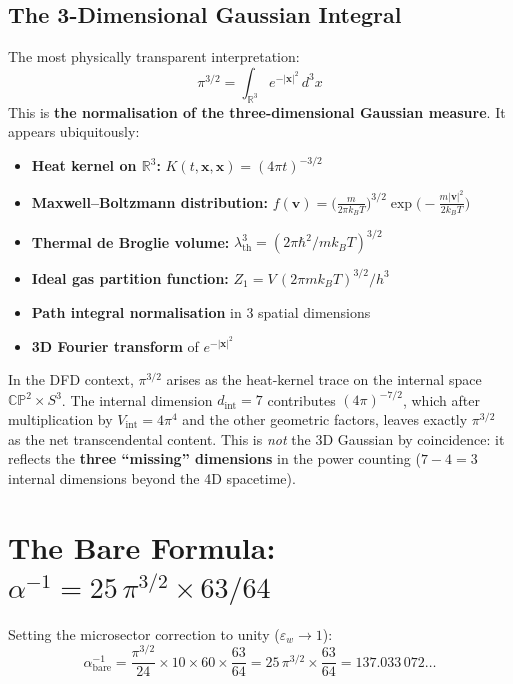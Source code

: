 \documentclass[11pt]{article}
\newcommand{\CP}{\mathbb{CP}}
\begin{document}
\subsection{The 3-Dimensional Gaussian Integral}

The most physically transparent interpretation:
\begin{equation}
\boxed{\;
\pi^{3/2} = \int_{\mathbb{R}^3} e^{-|\mathbf{x}|^2}\,d^3x
\;}
\label{eq:gauss3}
\end{equation}
This is \textbf{the normalisation of the three-dimensional Gaussian measure}.
It appears ubiquitously:
\begin{itemize}
\item \textbf{Heat kernel on $\mathbb{R}^3$:}\;
      $K(t,\mathbf{x},\mathbf{x}) = (4\pi t)^{-3/2}$
\item \textbf{Maxwell--Boltzmann distribution:}\;
      $f(\mathbf{v}) = \bigl(\tfrac{m}{2\pi k_BT}\bigr)^{3/2}
       \exp\!\bigl(-\tfrac{m|\mathbf{v}|^2}{2k_BT}\bigr)$
\item \textbf{Thermal de Broglie volume:}\;
      $\lambda_{\mathrm{th}}^3 = (2\pi\hbar^2/mk_BT)^{3/2}$
\item \textbf{Ideal gas partition function:}\;
      $Z_1 = V\,(2\pi mk_BT)^{3/2}/h^3$
\item \textbf{Path integral normalisation} in 3 spatial dimensions
\item \textbf{3D Fourier transform} of $e^{-|\mathbf{x}|^2}$
\end{itemize}

In the DFD context, $\pi^{3/2}$ arises as the heat-kernel trace on the
internal space $\CP^2 \times S^3$.  The internal dimension
$d_{\mathrm{int}} = 7$ contributes $(4\pi)^{-7/2}$, which after
multiplication by $V_{\mathrm{int}} = 4\pi^4$ and the other geometric
factors, leaves exactly $\pi^{3/2}$ as the net transcendental content.
This is \emph{not} the 3D Gaussian by coincidence: it reflects the
\textbf{three ``missing'' dimensions} in the power counting
($7 - 4 = 3$ internal dimensions beyond the 4D spacetime).


\section{The Bare Formula: $\alpha^{-1} = 25\,\pi^{3/2} \times 63/64$}
\label{sec:bare}

Setting the microsector correction to unity ($\varepsilon_w \to 1$):
\begin{equation}
\alpha^{-1}_{\mathrm{bare}}
= \frac{\pi^{3/2}}{24} \times 10 \times 60 \times \frac{63}{64}
= 25\,\pi^{3/2} \times \frac{63}{64}
= 137.033\,072\ldots
\label{eq:bare}
\end{equation}
\end{document}
